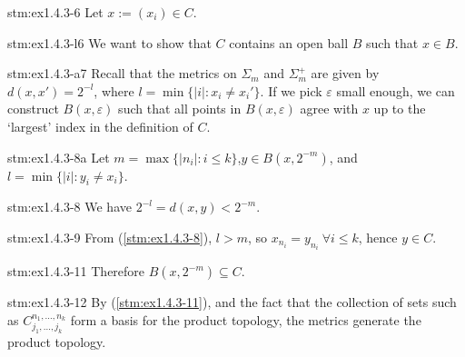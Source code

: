 \begin{statement}{stm:ex1.4.3-6}
    Let $x := (x_i)  \in C$.
\end{statement}

\begin{explanation}{stm:ex1.4.3-l6}
We want to show that $C$ contains an open ball $B$ such that $x \in B$.
\end{explanation}

\begin{explanation}{stm:ex1.4.3-a7}
Recall that the metrics on $\Sigma_m$ and $\Sigma_m^+$ are given by $d(x,x') = 2^{-l}$, where $l = \min \{ |i| : x_i \ne x_i' \}$. If we pick $\varepsilon$ small enough, we can construct $B(x, \varepsilon)$ such that all points in $B(x, \varepsilon)$ agree with $x$ up to the ‘largest’ index in the definition of $C$.
\end{explanation}

\begin{statement}{stm:ex1.4.3-8a}
Let $m = \max \{ |n_i| : i \leq k \}$,$y \in B(x, 2^{-m})$, and $l = \min \{ |i| : y_i \ne x_i \}$. 
\end{statement}

\begin{statement}{stm:ex1.4.3-8}
We have $2^{-l} = d(x,y) < 2^{-m}$.
\end{statement}

\begin{statement}{stm:ex1.4.3-9}
From (\ref{stm:ex1.4.3-8}), $l > m$, so $x_{n_i} = y_{n_i} \ \forall i \leq k$, hence $y \in C$.
\end{statement}

\begin{statement}{stm:ex1.4.3-11}
Therefore $B(x, 2^{-m}) \subseteq C$.
\end{statement}

\begin{statement}{stm:ex1.4.3-12}
By (\ref{stm:ex1.4.3-11}), and the fact that the collection of sets such as $C_{j_1,\ldots,j_k}^{n_1,\ldots,n_k}$ form a basis for the product topology, the metrics generate the product topology.
\end{statement}